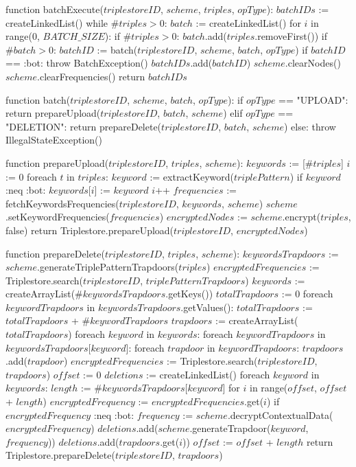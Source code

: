 function batchExecute($triplestoreID$, $scheme$, $triples$, $opType$):
    $batchIDs$ := createLinkedList()
    while $\#triples > 0$: 
        $batch$ := createLinkedList()
        for $i$ in range(0, $BATCH\_SIZE$):
            if $\#triples > 0$:
                $batch$.add($triples$.removeFirst())
        if $\#batch > 0$:
            $batchID$ := batch($triplestoreID$, $scheme$, $batch$, $opType$)
            if $batchID$ == :bot:
                throw BatchException()
            $batchIDs$.add($batchID$)
        $scheme$.clearNodes()
    $scheme$.clearFrequencies()
    return $batchIDs$

function batch($triplestoreID$, $scheme$, $batch$, $opType$):
    if $opType$ == "UPLOAD":
        return prepareUpload($triplestoreID$, $batch$, $scheme$)
    elif $opType$ == "DELETION":
        return prepareDelete($triplestoreID$, $batch$, $scheme$)
    else:
        throw IllegalStateException()
        
function prepareUpload($triplestoreID$, $triples$, $scheme$):
    $keywords$ := [$\#triples$]
    $i$ := 0
    foreach $t$ in $triples$:
        $keyword$ := extractKeyword($triplePattern$) 
        if $keyword$ :neq :bot:
            $keywords$[$i$] := $keyword$
            $i$++
    $frequencies$ := fetchKeywordsFrequencies($triplestoreID$, $keywords$, $scheme$)
    $scheme$.setKeywordFrequencies($frequencies$)
    $encryptedNodes$ := $scheme$.encrypt($triples$, false)
    return Triplestore.prepareUpload($triplestoreID$, $encryptedNodes$)

function prepareDelete($triplestoreID$, $triples$, $scheme$):
    $keywordsTrapdoors$ := $scheme$.generateTriplePatternTrapdoors($triples$)
    $encryptedFrequencies$ := Triplestore.search($triplestoreID$, $triplePatternTrapdoors$)
    $keywords$ := createArrayList($\#keywordsTrapdoors$.getKeys())
    $totalTrapdoors$ := 0
    foreach $keywordTrapdoors$ in $keywordsTrapdoors$.getValues():
        $totalTrapdoors$ := $totalTrapdoors$ + $\#keywordTrapdoors$
    $trapdoors$ := createArrayList($totalTrapdoors$)
    foreach $keyword$ in $keywords$:
        foreach $keywordTrapdoors$ in $keywordsTrapdoors$[$keyword$]:
            foreach $trapdoor$ in $keywordTrapdoors$:
                $trapdoors$.add($trapdoor$)
    $encryptedFrequencies$ := Triplestore.search($triplestoreID$, $trapdoors$)
    $offset$ := 0
    $deletions$ := createLinkedList()
    foreach $keyword$ in $keywords$:
        $length$ := $\#keywordsTrapdoors$[$keyword$]
        for $i$ in range($offset$, $offset$ + $length$) 
            $encryptedFrequency$ := $encryptedFrequencies$.get($i$)
            if $encryptedFrequency$ :neq :bot:
                $frequency$ := $scheme$.decryptContextualData($encryptedFrequency$)
                $deletions$.add($scheme$.generateTrapdoor($keyword$, $frequency$))
                $deletions$.add($trapdoors$.get($i$))
        $offset$ := $offset$ + $length$
    return Triplestore.prepareDelete($triplestoreID$, $trapdoors$)

